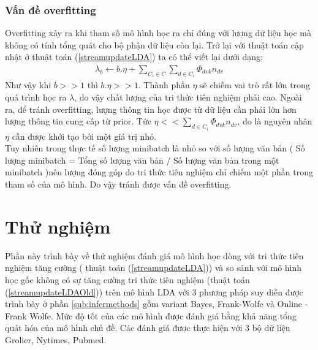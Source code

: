 \documentclass[fontsize=13pt]{scrartcl}
\begin{document}
\subsubsection{Vấn đề overfitting}
Overfitting xảy ra khi tham số mô hình học ra chỉ đúng với lượng dữ liệu học mà không có tính tổng quát cho bộ phận dữ liệu còn lại. Trở lại với thuật toán cập nhật ở thuật toán (\ref{streamupdateLDA}) ta có thể viết lại dưới dạng:
\begin{align}
\lambda_{b} \leftarrow b.\eta +  \sum_{C_i \in C}\sum_{d \in C_i} \Phi_{dvk}n_{dv}
\end{align}
Như vậy khi $b>>1$ thì $b.\eta >> 1$.
Thành phần $\eta$ sẽ chiếm vai trò rất lớn trong quá trình học ra $\lambda$, do vậy chất lượng của tri thức tiên nghiệm phải cao. Ngoài ra, để tránh overfitting, lượng thông tin học được từ dữ liệu cần phải lớn hơn lượng thông tin cung cấp từ prior.
Tức $\eta << \sum_{d \in C_i} \Phi_{dvk}n_{dv}$, do là nguyên nhân $\eta$ cần được khởi tạo bởi một giá trị nhỏ. \\
Tuy nhiên trong thực tế số lượng minibatch là nhỏ so với số lượng văn bản ( Số lượng minibatch =  Tổng số lượng văn bản / Số lượng văn bản trong một minibatch )nên lượng đóng góp do tri thức tiên nghiệm chỉ chiếm một phần trong tham số của mô hình. Do vậy tránh được vấn đề overfitting.
\newpage
\section{Thử nghiệm}
\label{sec:partIV}
Phần này trình bày về thử nghiệm đánh giá mô hình học dòng với tri thức tiên nghiệm tăng cường ( thuật toán (\ref{streamupdateLDA}))  và so sánh với mô hình học gốc không có sự tăng cường tri thức tiên nghiệm (thuật toán (\ref{streamupdateLDAOld})) trên mô hình LDA với 3 phương pháp suy diễn được trình bày ở phần \ref{sub:infermethods} gồm variant Bayes, Frank-Wolfe và Online - Frank Wolfe. Mức độ tốt của các mô hình được đánh giá bằng khả năng tổng quát hóa của mô hình chủ đề. Các đánh giá được thực hiện với 3 bộ dữ liệu Grolier, Nytimes, Pubmed.
\end{document}

